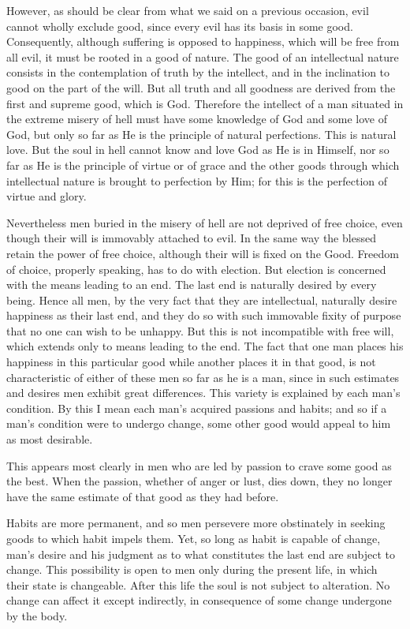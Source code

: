 \documentclass{bookclub}
\begin{document}
\begin{multicols}{2}
	However, as should be clear from what we said on a previous occasion, evil cannot wholly exclude good, since every evil has its basis in some good. Consequently, although suffering is opposed to happiness, which will be free from all evil, it must be rooted in a good of nature. The good of an intellectual nature consists in the contemplation of truth by the intellect, and in the inclination to good on the part of the will. But all truth and all goodness are derived from the first and supreme good, which is God. Therefore the intellect of a man situated in the extreme misery of hell must have some knowledge of God and some love of God, but only so far as He is the principle of natural perfections. This is natural love. But the soul in hell cannot know and love God as He is in Himself, nor so far as He is the principle of virtue or of grace and the other goods through which intellectual nature is brought to perfection by Him; for this is the perfection of virtue and glory.
	
	Nevertheless men buried in the misery of hell are not deprived of free choice, even though their will is immovably attached to evil. In the same way the blessed retain the power of free choice, although their will is fixed on the Good. Freedom of choice, properly speaking, has to do with election. But election is concerned with the means leading to an end. The last end is naturally desired by every being. Hence all men, by the very fact that they are intellectual, naturally desire happiness as their last end, and they do so with such immovable fixity of purpose that no one can wish to be unhappy. But this is not incompatible with free will, which extends only to means leading to the end. The fact that one man places his happiness in this particular good while another places it in that good, is not characteristic of either of these men so far as he is a man, since in such estimates and desires men exhibit great differences. This variety is explained by each man’s condition. By this I mean each man’s acquired passions and habits; and so if a man’s condition were to undergo change, some other good would appeal to him as most desirable.
	
	This appears most clearly in men who are led by passion to crave some good as the best. When the passion, whether of anger or lust, dies down, they no longer have the same estimate of that good as they had before.
	
	Habits are more permanent, and so men persevere more obstinately in seeking goods to which habit impels them. Yet, so long as habit is capable of change, man’s desire and his judgment as to what constitutes the last end are subject to change. This possibility is open to men only during the present life, in which their state is changeable. After this life the soul is not subject to alteration. No change can affect it except indirectly, in consequence of some change undergone by the body.
	

\end{multicols}
\end{document}
